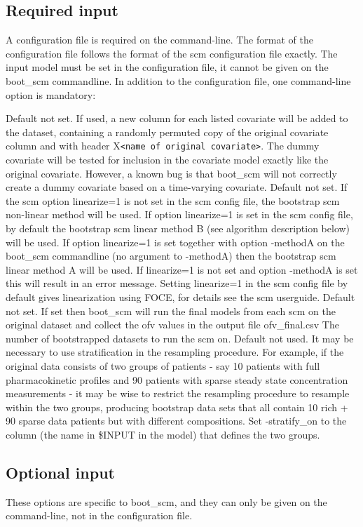 \subsection{Required input}
A configuration file is required on the command-line. The format of the configuration file follows the format of the scm configuration file exactly. 
The input model must be set in the configuration file, it cannot be given on the boot\_scm commandline. 
In addition to the configuration file, one command-line option is mandatory:
\begin{optionlist}
Default not set. If used, a new column for each listed covariate will be added to the dataset, 
containing a randomly permuted copy of the original covariate column and with header X\verb|<name of original covariate>|. 
The dummy covariate will be tested for inclusion in the covariate model exactly like the original covariate. 
However, a known bug is that boot\_scm will not correctly create a 
dummy covariate based on a time-varying covariate.
\nextopt
{}
Default not set. If the scm option linearize=1 is not set in the scm config file, 
the bootstrap scm non-linear method will be used. If option linearize=1 is set in the scm config file, 
by default the bootstrap scm linear method B (see algorithm description below) will be used. 
If option linearize=1 is set  together with option -methodA on the boot\_scm commandline (no argument to -methodA) 
then the bootstrap scm linear method A will be used. If linearize=1 
is not set and option -methodA is set this will result in an error message.  
Setting linearize=1 in the scm config file by default gives linearization using FOCE, for details see the
scm userguide.
\nextopt
{}
Default not set. If set then boot\_scm will run the final models from each scm on the original dataset and collect the ofv values 
in the output file ofv\_final.csv   
\nextopt
{}
The number of bootstrapped datasets to run the scm on. 
\nextopt
{}
Default not used. It may be necessary to use stratification in the resampling procedure. For example, if the original data consists of two groups 
of patients - say 10 patients with full pharmacokinetic profiles and 90 patients with sparse steady state concentration measurements - it may be 
wise to restrict the resampling procedure to resample within the two groups, producing bootstrap data sets that all contain 10 rich + 90 sparse 
data patients but with different compositions. 
Set -stratify\_on to the column (the name in \$INPUT in the model) that defines the two groups.
\nextopt
\end{optionlist}
\begin{optionlist}
\subsection{Optional input}
These options are specific to boot\_scm, and they can only be given on the command-line, not in the configuration file.
\end{optionlist}
